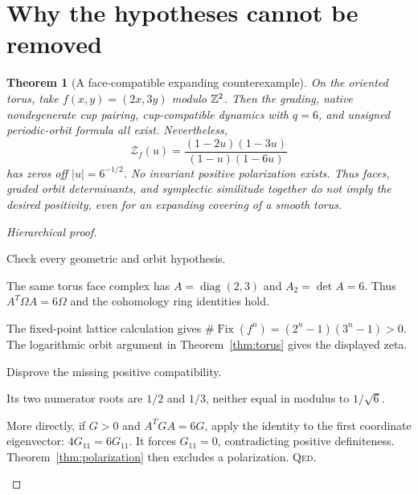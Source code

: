 \documentclass[11pt,a4paper]{article}
\newtheorem{theorem}[definition]{Theorem}
\theoremstyle{remark}\newtheorem{remark}[definition]{Remark}
\newcommand{\diag}{\operatorname{diag}}\newcommand{\id}{\operatorname{id}}
\newcommand{\QED}{\textsc{Qed}}
\begin{document}
\section{Why the hypotheses cannot be removed}

\begin{theorem}[A face-compatible expanding counterexample]\label{thm:anisotropic}
On the oriented torus, take $f(x,y)=(2x,3y)$ modulo $\mathbb Z^2$. Then the grading, native nondegenerate cup pairing, cup-compatible dynamics with $q=6$, and unsigned periodic-orbit formula all exist. Nevertheless,
\[
\mathcal Z_f(u)=\frac{(1-2u)(1-3u)}{(1-u)(1-6u)}
\]
has zeros off $|u|=6^{-1/2}$. No invariant positive polarization exists. Thus faces, graded orbit determinants, and symplectic similitude together do not imply the desired positivity, even for an expanding covering of a smooth torus.
\end{theorem}
\begin{proof}[Hierarchical proof]
\begin{steps}
\item Check every geometric and orbit hypothesis.
\begin{steps}
\item The same torus face complex has $A=\diag(2,3)$ and $A_2=\det A=6$. Thus $A^T\Omega A=6\Omega$ and the cohomology ring identities hold.
\item The fixed-point lattice calculation gives $\#\operatorname{Fix}(f^n)=(2^n-1)(3^n-1)>0$. The logarithmic orbit argument in Theorem~\ref{thm:torus} gives the displayed zeta.
\end{steps}
\item Disprove the missing positive compatibility.
\begin{steps}
\item Its two numerator roots are $1/2$ and $1/3$, neither equal in modulus to $1/\sqrt6$.
\item More directly, if $G>0$ and $A^TGA=6G$, apply the identity to the first coordinate eigenvector: $4G_{11}=6G_{11}$. It forces $G_{11}=0$, contradicting positive definiteness. Theorem~\ref{thm:polarization} then excludes a polarization. \QED.
\end{steps}
\end{steps}
\end{proof}
\end{document}
